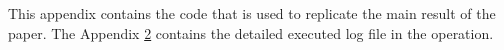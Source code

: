 \documentclass[12pt]{jfm}
\begin{document}




\newpage







\newpage


\appendix

\section{}\label{appA}

This appendix contains the code that is used to replicate the main result of the paper. The Appendix \ref{appB} contains the detailed executed log file in the operation.

\section{}\label{appB}
\end{document}

